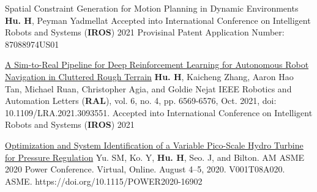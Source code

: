 


\begin{cventries}

  \cvpublicationentryextra
    {Spatial Constraint Generation for Motion Planning in Dynamic Environments} %
    {\textbf{Hu. H}, Peyman Yadmellat} %
    {Accepted into International Conference on Intelligent Robots and Systems (\textbf{IROS}) 2021}
    {Provisinal Patent Application Number: 87088974US01}

  \cvpublicationentryextra
    {\href{https://ieeexplore.ieee.org/document/9468918}{A Sim-to-Real Pipeline for Deep Reinforcement Learning for Autonomous Robot Navigation in Cluttered Rough Terrain}} %
    {\textbf{Hu. H}, Kaicheng Zhang, Aaron Hao Tan, Michael Ruan, Christopher Agia, and Goldie Nejat} %
    {IEEE Robotics and Automation Letters (\textbf{RAL}), vol. 6, no. 4, pp. 6569-6576, Oct. 2021, doi: 10.1109/LRA.2021.3093551.}
    {Accepted into International Conference on Intelligent Robots and Systems (\textbf{IROS}) 2021}

  \cvpublicationentrysimple
    {\href{https://asmedigitalcollection.asme.org/POWER/proceedings-abstract/POWER2020/83747/V001T08A020/1088386}{Optimization and System Identification of a Variable Pico-Scale Hydro Turbine for Pressure Regulation}} %
    {Yu. SM, Ko. Y, \textbf{Hu. H}, Seo. J, and Bilton. AM} %
    {ASME 2020 Power Conference. Virtual, Online. August 4–5, 2020. V001T08A020. ASME. https://doi.org/10.1115/POWER2020-16902}
    
\end{cventries}






